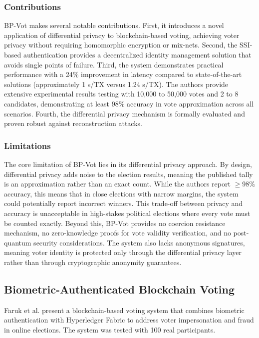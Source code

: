 \subsubsection{Contributions}
\label{subsubsec:bp-contrib}

BP-Vot makes several notable contributions. First, it introduces a novel application of differential privacy to blockchain-based voting, achieving voter privacy without requiring homomorphic encryption or mix-nets. Second, the SSI-based authentication provides a decentralized identity management solution that avoids single points of failure. Third, the system demonstrates practical performance with a 24\% improvement in latency compared to state-of-the-art solutions (approximately 1 s/TX versus 1.24 s/TX). The authors provide extensive experimental results testing with 10,000 to 50,000 votes and 2 to 8 candidates, demonstrating at least 98\% accuracy in vote approximation across all scenarios. Fourth, the differential privacy mechanism is formally evaluated and proven robust against reconstruction attacks.

\subsubsection{Limitations}
\label{subsubsec:bp-limits}

The core limitation of BP-Vot lies in its differential privacy approach. By design, differential privacy adds noise to the election results, meaning the published tally is an approximation rather than an exact count. While the authors report $\geq$98\% accuracy, this means that in close elections with narrow margins, the system could potentially report incorrect winners. This trade-off between privacy and accuracy is unacceptable in high-stakes political elections where every vote must be counted exactly. Beyond this, BP-Vot provides no coercion resistance mechanism, no zero-knowledge proofs for vote validity verification, and no post-quantum security considerations. The system also lacks anonymous signatures, meaning voter identity is protected only through the differential privacy layer rather than through cryptographic anonymity guarantees.

\subsection{Biometric-Authenticated Blockchain Voting}
\label{subsec:faruk}

Faruk et al. \cite{faruk2024} present a blockchain-based voting system that combines biometric authentication with Hyperledger Fabric to address voter impersonation and fraud in online elections. The system was tested with 100 real participants.

